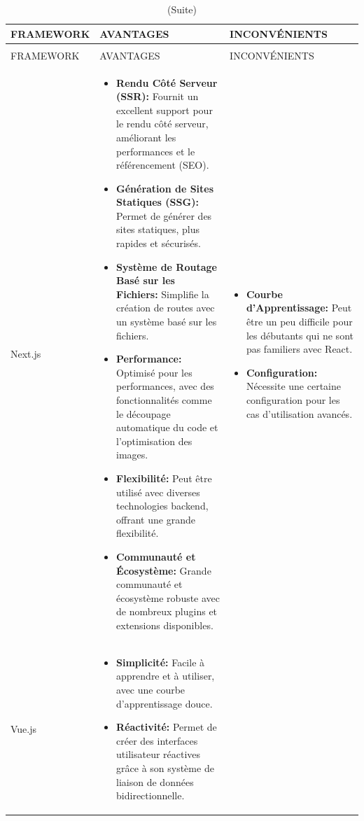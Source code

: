 \documentclass[12pt]{report}
\begin{document}
				\begin{longtable}{|p{3cm}|p{5.5cm}|p{5.5cm}|} 
						\caption{Comparaison entre Next.js et Vue.js.} 
						\label{tab:tableau 17}\\ 
						\hline 
						FRAMEWORK & AVANTAGES & INCONVÉNIENTS\\ 
						\hline 
						\endfirsthead 	
						\caption[]{(Suite)}\\ 
						\hline 
						FRAMEWORK & AVANTAGES & INCONVÉNIENTS\\ 
						\hline 
						\endhead
						Next.js&
						\begin{itemize}
							\item \textbf{Rendu Côté Serveur (SSR):} Fournit un excellent support pour le rendu côté serveur, améliorant les performances et le référencement (SEO).
							\item \textbf{Génération de Sites Statiques (SSG):} Permet de générer des sites statiques, plus rapides et sécurisés.
							\item \textbf{Système de Routage Basé sur les Fichiers:} Simplifie la création de routes avec un système basé sur les fichiers.
							\item \textbf{Performance:} Optimisé pour les performances, avec des fonctionnalités comme le découpage automatique du code et l'optimisation des images.
							\item \textbf{Flexibilité:} Peut être utilisé avec diverses technologies backend, offrant une grande flexibilité.
							\item \textbf{Communauté et Écosystème:} Grande communauté et écosystème robuste avec de nombreux plugins et extensions disponibles.
						\end{itemize}
						&
						\begin{itemize}
							\item \textbf{Courbe d'Apprentissage:} Peut être un peu difficile pour les débutants qui ne sont pas familiers avec React.
							\item \textbf{Configuration:} Nécessite une certaine configuration pour les cas d'utilisation avancés.
						\end{itemize}\\						
						\hline
						Vue.js&
						\begin{itemize}
							\item \textbf{Simplicité:} Facile à apprendre et à utiliser, avec une courbe d'apprentissage douce.
							\item \textbf{Réactivité:} Permet de créer des interfaces utilisateur réactives grâce à son système de liaison de données bidirectionnelle.

\end{itemize}
\end{longtable}
\end{document}

